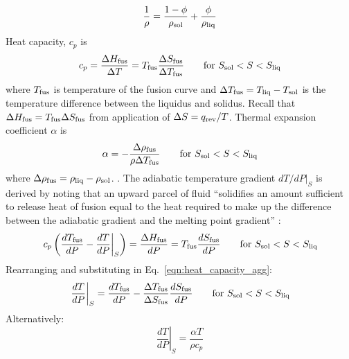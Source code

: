 \begin{equation}
\label{eqn:density_agg}
\dfrac{1}{\rho} = \dfrac{1-\phi}{\rho_{\rm sol}} + \frac{\phi}{\rho_{\rm liq}}%
\end{equation}
Heat capacity, $c_p$ \citep[e.g.,][]{SOLO07,SS293} is
\begin{equation}
\label{eqn:heat_capacity_agg}
c_p = \dfrac{ \Delta H_{\rm fus}}{\Delta T} = T_{\rm fus} \dfrac{\Delta S_{\rm fus}}{\Delta T_{\rm fus}} \quad \quad \text{for } S_{\rm sol}<S<S_{\rm liq}
\end{equation}
where $T_{\rm fus}$ is temperature of the fusion curve and $\Delta T_{\rm fus} = T_{\rm liq}-T_{\rm sol}$ is the temperature difference between the liquidus and solidus.  Recall that $\Delta H _{\rm fus} = T_{\rm fus} \Delta S_{\rm fus}$ from application of $\Delta S = q_{\rm rev}/T$.  Thermal expansion coefficient $\alpha$ \citep[e.g.,][]{SOLO07,SS293} is
\begin{equation}
\label{eqn:thermal_exp_agg}
\alpha = -\dfrac{\Delta \rho_{\rm fus}}{\rho \Delta T_{\rm fus}} \quad \quad \text{for } S_{\rm sol}<S<S_{\rm liq}
\end{equation}
where $\Delta \rho_{\rm fus} = \rho_{\rm liq} - \rho_{\rm sol}$.  . The adiabatic temperature gradient $dT/dP|_S$ is derived by noting that an upward parcel of fluid ``solidifies an amount sufficient to release heat of fusion equal to the heat required to make up the difference between the adiabatic gradient and the melting point gradient'' \citep[quoting from][]{HK71}:
\begin{equation}
\label{eqn:adiabatic_temp_grad_derivation}
\left. c_p \left( \dfrac{dT_{\rm fus}}{dP} - \dfrac{dT}{dP} \right|_S \right) = \dfrac{\Delta H_{\rm fus}}{dP} = T_{\rm fus} \dfrac{d S_{\rm fus}}{dP} \quad \quad \text{for } S_{\rm sol}<S<S_{\rm liq}
\end{equation}
Rearranging and substituting in Eq.~\ref{eqn:heat_capacity_agg}:
\begin{equation}
\label{eqn:adiabatic_temp_grad}
\left. \dfrac{dT}{dP} \right|_S = \dfrac{dT_{\rm fus}}{dP} - \dfrac{\Delta T_{\rm fus}}{\Delta S_{\rm fus}} \dfrac{d S_{\rm fus}}{dP} \quad \quad \text{for } S_{\rm sol}<S<S_{\rm liq}
\end{equation}
Alternatively:
\begin{equation}
\label{eqn:adiabatic_temp_grad2}
\left. \dfrac{dT}{dP} \right|_S = \dfrac{\alpha T}{\rho c_p}
\end{equation}
